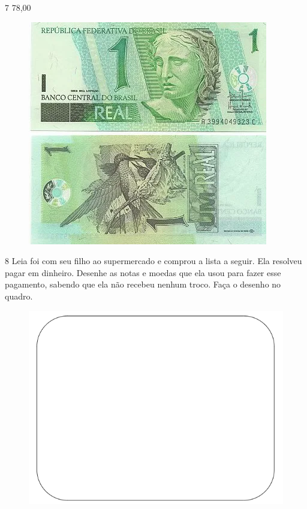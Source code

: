 

\pagebreak
\num{7} 78,00

\begin{figure}[htpb!]
\includegraphics[width=.9\textwidth]{./media/image70.png}
\end{figure}



\pagebreak

\num{8} Leia foi com seu filho ao supermercado e comprou a lista a seguir. Ela
resolveu pagar em dinheiro. Desenhe as notas e moedas que ela usou para
fazer esse pagamento, sabendo que ela não recebeu nenhum troco. Faça o
desenho no quadro.


\begin{figure}[htpb!]
\includegraphics[width=\textwidth]{./media/image75.png}
\end{figure}


